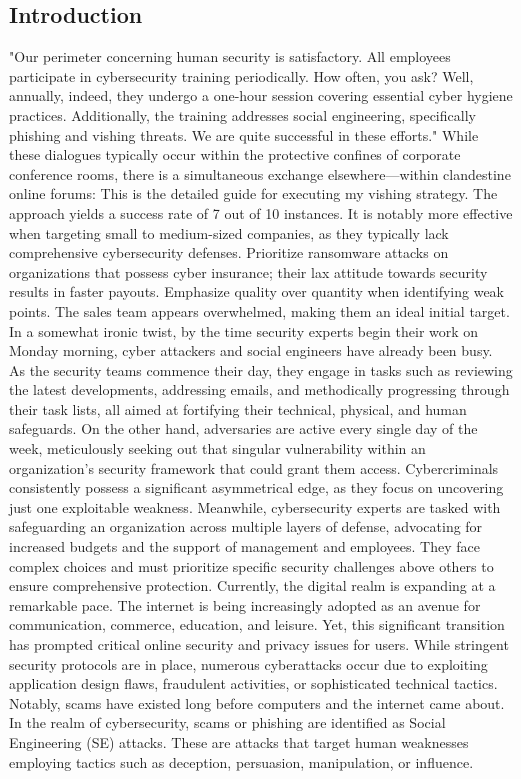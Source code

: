 \subsection{Introduction}
"Our perimeter concerning human security is satisfactory. All employees participate in cybersecurity training periodically. How often, you ask? Well, annually, indeed, they undergo a one-hour session covering essential cyber hygiene practices. Additionally, the training addresses social engineering, specifically phishing and vishing threats. We are quite successful in these efforts."
While these dialogues typically occur within the protective confines of corporate conference rooms, there is a simultaneous exchange elsewhere—within clandestine online forums:
This is the detailed guide for executing my vishing strategy. The approach yields a success rate of 7 out of 10 instances. It is notably more effective when targeting small to medium-sized companies, as they typically lack comprehensive cybersecurity defenses. Prioritize ransomware attacks on organizations that possess cyber insurance; their lax attitude towards security results in faster payouts. Emphasize quality over quantity when identifying weak points. The sales team appears overwhelmed, making them an ideal initial target.
In a somewhat ironic twist, by the time security experts begin their work on Monday morning, cyber attackers and social engineers have already been busy. As the security teams commence their day, they engage in tasks such as reviewing the latest developments, addressing emails, and methodically progressing through their task lists, all aimed at fortifying their technical, physical, and human safeguards. On the other hand, adversaries are active every single day of the week, meticulously seeking out that singular vulnerability within an organization's security framework that could grant them access.
Cybercriminals consistently possess a significant asymmetrical edge, as they focus on uncovering just one exploitable weakness. Meanwhile, cybersecurity experts are tasked with safeguarding an organization across multiple layers of defense, advocating for increased budgets and the support of management and employees. They face complex choices and must prioritize specific security challenges above others to ensure comprehensive protection.
Currently, the digital realm is expanding at a remarkable pace. The internet is being increasingly adopted as an avenue for communication, commerce, education, and leisure. Yet, this significant transition has prompted critical online security and privacy issues for users. While stringent security protocols are in place, numerous cyberattacks occur due to exploiting application design flaws, fraudulent activities, or sophisticated technical tactics. Notably, scams have existed long before computers and the internet came about. In the realm of cybersecurity, scams or phishing are identified as Social Engineering (SE) attacks. These are attacks that target human weaknesses employing tactics such as deception, persuasion, manipulation, or influence.
